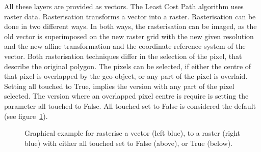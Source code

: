 All these layers are provided as vectors.
The Least Cost Path algorithm uses raster data.
Rasterisation transforms a vector into a raster.
Rasterisation can be done in two different ways.
In both ways, the rasterisation can be imaged, as the old vector is superimposed on the new raster grid with the new
given resolution and the new affine transformation and the coordinate reference system of the vector.
Both rasterisation techniques differ in the selection of the pixel, that describe the original polygon.
The pixels can be selected, if either the centre of that pixel is overlapped
by the geo-object, or any part of the pixel is overlaid.
Setting all touched to True, implies the version with any part of the pixel selected.
The version where an overlapped pixel centre is require is setting the parameter all touched to False.
All touched set to False is considered the default (see figure~\ref{fig:alltouched}).
\begin{figure}[!ht]
	\centering

	\vspace*{5mm}
	\caption{Graphical example for rasterise a vector (left blue), to a raster (right blue) with either all touched set to False (above), or True (below).}
	\label{fig:alltouched}

\end{figure}

